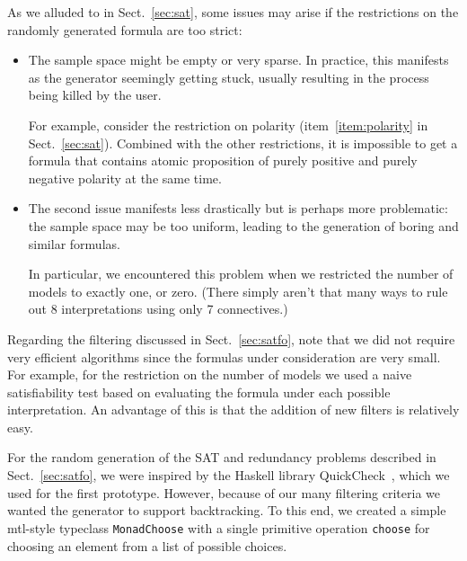As we alluded to in Sect.~\ref{sec:sat},
some issues may arise if the restrictions on the randomly generated formula are too strict:
\begin{itemize}
    \item
        The sample space might be empty or very sparse.
        In practice, this manifests as the generator seemingly getting stuck,
        usually resulting in the process being killed by the user.

        For example,
        consider the restriction on polarity (item~\ref{item:polarity} in Sect.~\ref{sec:sat}).
        Combined with the other restrictions,
        it is impossible to get a formula that contains atomic proposition
        of purely positive and purely negative polarity at the same time.

    \item
        The second issue manifests less drastically but is perhaps more problematic:
        the sample space may be too uniform,
        leading to the generation of boring and similar formulas.

        In particular, we encountered this problem
        when we restricted the number of models to exactly one, or zero.
        (There simply aren't that many ways to rule out 8 interpretations
        using only 7 connectives.)
\end{itemize}





Regarding the filtering discussed in Sect.~\ref{sec:satfo},
note that we did not require very efficient algorithms since
the formulas under consideration are very small.
For example, for the restriction on the number of models we used a naive satisfiability test
based on evaluating the formula under each possible interpretation.
An advantage of this is that the addition of new filters is relatively easy.





For the random generation of the SAT and redundancy problems described in Sect.~\ref{sec:satfo},
we were inspired by the Haskell library QuickCheck~\cite{ClaessenHughes:2000:QuickCheck},
which we used for the first prototype.
However, because of our many filtering criteria we wanted the generator to support backtracking.
To this end,
we created a simple mtl-style typeclass \texttt{MonadChoose}
with a single primitive operation \texttt{choose} for choosing an element from a list of possible choices.

